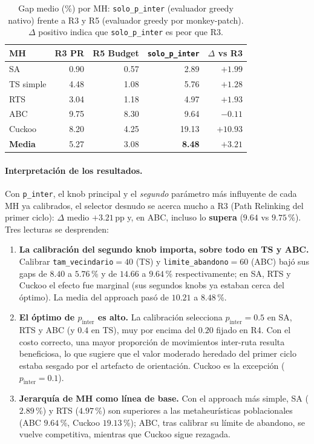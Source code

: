 \begin{table}[h]
\centering
\caption{Gap medio (\%) por MH: \texttt{solo\_p\_inter} (evaluador greedy nativo)
         frente a R3 y R5 (evaluador greedy por monkey-patch).
         $\Delta$ positivo indica que \texttt{solo\_p\_inter} es peor que R3.}
\label{tab:solo-p-inter-comparativa}
\small
\begin{tabular}{lrrrr}
\toprule
MH & R3 PR & R5 Budget & \texttt{solo\_p\_inter} & $\Delta$ vs R3 \\
\midrule
SA        & 0.90  & 0.57 & 2.89  & $+1.99$  \\
TS simple & 4.48  & 1.08 & 5.76  & $+1.28$  \\
RTS       & 3.04  & 1.18 & 4.97  & $+1.93$  \\
ABC       & 9.75  & 8.30 & 9.64  & $-0.11$  \\
Cuckoo    & 8.20  & 4.25 & 19.13 & $+10.93$ \\
\midrule
\textbf{Media} & 5.27 & 3.08 & \textbf{8.48} & $+3.21$ \\
\bottomrule
\end{tabular}
\end{table}

\paragraph{Interpretación de los resultados.}
Con \texttt{p\_inter}, el knob principal y el \emph{segundo} parámetro más
influyente de cada MH ya calibrados, el selector desnudo se acerca mucho a R3
(Path Relinking del primer ciclo): $\Delta$ medio $+3.21$\,pp y, en ABC, incluso
lo \textbf{supera} ($9.64$ vs $9.75$\,\%). Tres lecturas se desprenden:

\begin{enumerate}
\item \textbf{La calibración del segundo knob importa, sobre todo en TS y ABC.}
  Calibrar \texttt{tam\_vecindario}$=40$ (TS) y \texttt{limite\_abandono}$=60$
  (ABC) bajó sus gaps de $8.40$ a $5.76$\,\% y de $14.66$ a $9.64$\,\%
  respectivamente; en SA, RTS y Cuckoo el efecto fue marginal (sus segundos
  knobs ya estaban cerca del óptimo). La media del approach pasó de
  $10.21$ a $8.48$\,\%.
\item \textbf{El óptimo de $p_{\text{inter}}$ es alto.} La calibración
  selecciona $p_{\text{inter}} = 0.5$ en SA, RTS y ABC (y $0.4$ en TS),
  muy por encima del $0.20$ fijado en R4. Con el costo correcto, una
  mayor proporción de movimientos inter-ruta resulta beneficiosa, lo
  que sugiere que el valor moderado heredado del primer ciclo estaba
  sesgado por el artefacto de orientación. Cuckoo es la excepción
  ($p_{\text{inter}} = 0.1$).
\item \textbf{Jerarquía de MH como línea de base.} Con el approach más
  simple, SA ($2.89$\,\%) y RTS ($4.97$\,\%) son superiores a las
  metaheurísticas poblacionales (ABC $9.64$\,\%, Cuckoo $19.13$\,\%); ABC,
  tras calibrar su límite de abandono, se vuelve competitiva, mientras que
  Cuckoo sigue rezagada.
\end{enumerate}

